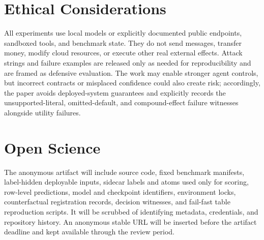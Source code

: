 \documentclass[letterpaper,twocolumn,10pt]{article}
\begin{document}
\appendix
\section{Ethical Considerations}

All experiments use local models or explicitly documented public endpoints, sandboxed tools, and benchmark state. They do not send messages, transfer money, modify cloud resources, or execute other real external effects. Attack strings and failure examples are released only as needed for reproducibility and are framed as defensive evaluation. The work may enable stronger agent controls, but incorrect contracts or misplaced confidence could also create risk; accordingly, the paper avoids deployed-system guarantees and explicitly records the unsupported-literal, omitted-default, and compound-effect failure witnesses alongside utility failures.
 \section{Open Science}

The anonymous artifact will include source code, fixed benchmark manifests, label-hidden deployable inputs, sidecar labels and atoms used only for scoring, row-level predictions, model and checkpoint identifiers, environment locks, counterfactual registration records, decision witnesses, and fail-fast table reproduction scripts. It will be scrubbed of identifying metadata, credentials, and repository history. An anonymous stable URL will be inserted before the artifact deadline and kept available through the review period.
 
\end{document}
